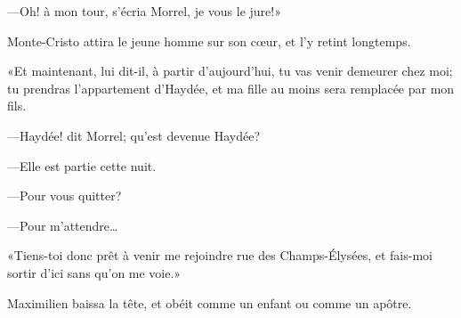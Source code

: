 —Oh! à mon tour, s'écria Morrel, je vous le jure!» 

Monte-Cristo attira le jeune homme sur son cœur, et l'y retint longtemps. 

«Et maintenant, lui dit-il, à partir d'aujourd'hui, tu vas venir demeurer chez moi; tu prendras l'appartement d'Haydée, et ma fille au moins sera remplacée par mon fils. 

—Haydée! dit Morrel; qu'est devenue Haydée? 

—Elle est partie cette nuit. 

—Pour vous quitter? 

—Pour m'attendre\dots 

«Tiens-toi donc prêt à venir me rejoindre rue des Champs-Élysées, et fais-moi sortir d'ici sans qu'on me voie.» 

Maximilien baissa la tête, et obéit comme un enfant ou comme un apôtre. 